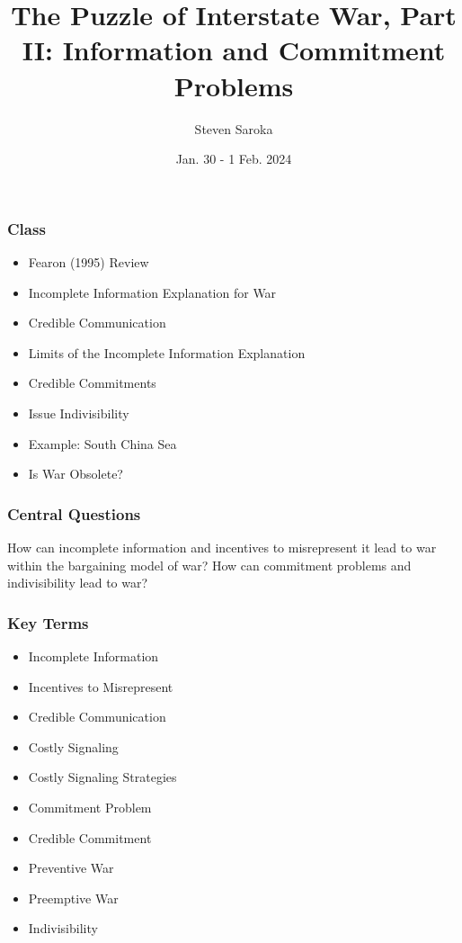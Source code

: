 \documentclass{beamer}
\title[The Puzzle of War (II)]{\LARGE{The Puzzle of Interstate War, Part II: Information and Commitment Problems}}
\author[POLI 150]{Steven Saroka}
\institute{POLI 150}
\date{Jan. 30 - 1 Feb. 2024}
\begin{document}
\begin{frame}
\titlepage %
\end{frame}

\begin{frame} 
	\frametitle{\LARGE{Class}}
	\begin{itemize}
		
			\item Fearon (1995) Review

			\item Incomplete Information Explanation for War

			\item Credible Communication

			\item Limits of the Incomplete Information Explanation
			\item Credible Commitments

			\item Issue Indivisibility

			\item Example: South China Sea

			\item Is War Obsolete?
		
	\end{itemize}
\end{frame}

\begin{frame} 
	\frametitle{\LARGE{Central Questions}}
	\begin{center}
		\LARGE How can incomplete information and incentives to misrepresent it lead to war within the bargaining model of war? How can commitment problems and indivisibility lead to war? 
	\end{center}
\end{frame}

\begin{frame} 
	\frametitle{\LARGE{Key Terms}}
	\begin{itemize}
		\item Incomplete Information 
		\item Incentives to Misrepresent
		\item Credible Communication
		\item Costly Signaling
		\item Costly Signaling Strategies
		\item Commitment Problem 
		\item Credible Commitment
		\item Preventive War
		\item Preemptive War
		\item Indivisibility
	\end{itemize}
\end{frame}
\end{document}
